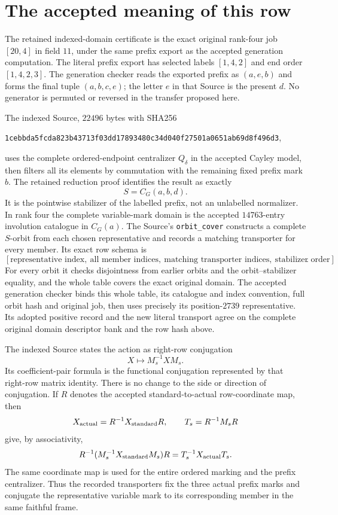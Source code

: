 \documentclass[11pt]{article}
\begin{document}
\section*{The accepted meaning of this row}

The retained indexed-domain certificate is the exact original rank-four
job $[20,4]$ in field $11$, under the same prefix export as the accepted
generation computation.  The literal prefix export has selected labels
$[1,4,2]$ and end order $[1,4,2,3]$.  The generation checker reads the
exported prefix as $(a,e,b)$ and forms the final tuple $(a,b,c,e)$;
the letter $e$ in that Source is the present $d$.  No generator is
permuted or reversed in the transfer proposed here.

The indexed Source, $22496$ bytes with SHA256
\begin{center}\small\texttt{1cebbda5fcda823b43713f03dd17893480c34d040f27501a0651ab69d8f496d3},\end{center}
uses the complete ordered-endpoint centralizer $Q_\delta$ in the
accepted Cayley model, then filters all its elements by commutation with
the remaining fixed prefix mark $b$.  The retained reduction proof
identifies the result as exactly
\[
                         S=C_G(a,b,d).
\]
It is the pointwise stabilizer of the labelled prefix, not an unlabelled
normalizer.  In rank four the complete variable-mark domain is the
accepted $14763$-entry involution catalogue in $C_G(a)$.  The Source's
\texttt{orbit\_cover} constructs a complete $S$-orbit from each chosen
representative and records a matching transporter for every member.
Its exact row schema is
\[
 [\text{representative index},\ \text{all member indices},\
   \text{matching transporter indices},\ \text{stabilizer order}].
\]
For every orbit it checks disjointness from earlier orbits and the
orbit--stabilizer equality, and the whole table covers the exact original
domain.  The accepted generation checker binds this whole table, its
catalogue and index convention, full orbit hash and original job, then
uses precisely its position-$2739$ representative.  Its adopted positive
record and the new literal transport agree on the complete original
domain descriptor bank and the row hash above.

The indexed Source states the action as right-row conjugation
\[
                           X\longmapsto M_s^{-1}XM_s.
\]
Its coefficient-pair formula is the functional conjugation represented
by that right-row matrix identity.  There is no change to the side or
direction of conjugation.  If $R$ denotes the accepted standard-to-actual
row-coordinate map, then
\[
 X_{\rm actual}=R^{-1}X_{\rm standard}R,\qquad
 T_s=R^{-1}M_sR
\]
give, by associativity,
\[
 R^{-1}(M_s^{-1}X_{\rm standard}M_s)R
                         =T_s^{-1}X_{\rm actual}T_s.
\]
The same coordinate map is used for the entire ordered marking and the
prefix centralizer.  Thus the recorded transporters fix the three actual
prefix marks and conjugate the representative variable mark to its
corresponding member in the same faithful frame.
\end{document}
